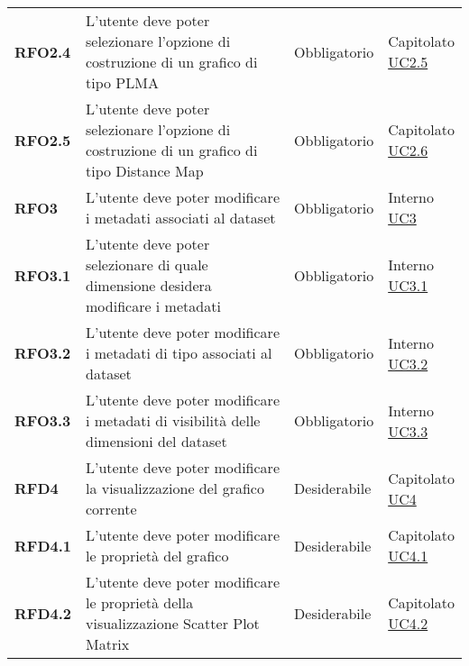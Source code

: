 \begin{longtable}[H]{>{\raggedright\bfseries}m{20mm} >{\raggedright}m{90mm} >{\raggedright}m{28mm} >{\raggedright\arraybackslash}m{30mm}}
    RFO2.4
    & L'utente deve poter selezionare l'opzione di costruzione di un grafico di tipo PLMA
    & Obbligatorio
    & \makecell{Capitolato \\ \hyperref[ssub:uc2.5]{UC2.5}}\\

    RFO2.5
    & L'utente deve poter selezionare l'opzione di costruzione di un grafico di tipo Distance Map
    & Obbligatorio
    & \makecell{Capitolato \\ \hyperref[ssub:uc2.6]{UC2.6}}\\

    RFO3
    & L'utente deve poter modificare i metadati associati al dataset
    & Obbligatorio
    & \makecell{ Interno \\  \hyperref[sub:uc3]{UC3} }\\

    RFO3.1
    & L'utente deve poter selezionare di quale dimensione desidera modificare i metadati
    & Obbligatorio
    & \makecell{ Interno \\\hyperref[ssub:uc3.1]{UC3.1} }\\

    RFO3.2
    & L'utente deve poter modificare i metadati di tipo associati al dataset
    & Obbligatorio
    & \makecell{ Interno \\\hyperref[ssub:uc3.2]{UC3.2} }\\

    RFO3.3
    & L'utente deve poter modificare i metadati di visibilità delle dimensioni del dataset
    & Obbligatorio
    & \makecell{ Interno \\  \hyperref[ssub:uc3.3]{UC3.3} }\\

    RFD4
    & L'utente deve poter modificare la visualizzazione del grafico corrente
    & Desiderabile
    & \makecell{ Capitolato \\ \hyperref[sub:uc4]{UC4} }\\

    RFD4.1
    & L'utente deve poter modificare le proprietà del grafico
    & Desiderabile
    & \makecell{ Capitolato \\ \hyperref[ssub:uc4.1]{UC4.1} }\\

    RFD4.2
    & L'utente deve poter modificare le proprietà della visualizzazione Scatter Plot Matrix
    & Desiderabile
    & \makecell{ Capitolato \\ \hyperref[ssub:uc4.2]{UC4.2} }\\


\end{longtable}
